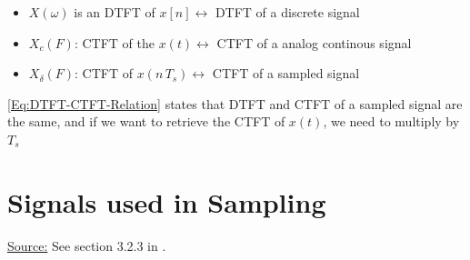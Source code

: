 \documentclass[12pt,a4paper]{book}
\begin{document}
\begin{itemize}
    \item $X(\omega)$ is an DTFT of $x[n] \leftrightarrow$ DTFT of a discrete signal
    
    \item $X_c(F)$: CTFT of the $x(t) \leftrightarrow$ CTFT of a analog continous signal
    
    \item $X_{\delta}(F)$: CTFT of $x(n \, T_s) \leftrightarrow$ CTFT of a sampled signal 
    
\end{itemize}

\autoref{Eq:DTFT-CTFT-Relation} states that DTFT and CTFT of a sampled signal are the same, and if we want to retrieve the CTFT of $x(t)$, we need to multiply by $T_s$

\section{Signals used in Sampling}

\underline{Source:} See section 3.2.3 in \cite{sampling_beyond_band_limited_systems}.
\end{document}
